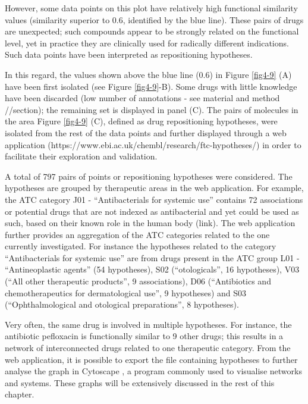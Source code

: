 However, some data points on this plot have relatively high functional similarity values (similarity superior to 0.6, identified by the blue line). These pairs of drugs are unexpected; such compounds appear to be strongly related on the functional level, yet in practice they are clinically used for radically different indications. Such data points have been interpreted as repositioning hypotheses.

In this regard, the values shown above the blue line (0.6) in Figure \ref{fig4-9} (A) have been first isolated (see Figure \ref{fig4-9}-B). Some drugs with little knowledge have been discarded (low number of annotations - see material and method //section); the remaining set is displayed in panel (C). The pairs of molecules in the area Figure \ref{fig4-9} (C), defined as drug repositioning hypotheses, were isolated from the rest of the data points and further displayed through a web application (https://www.ebi.ac.uk/chembl/research/ftc-hypotheses/) in order to facilitate their exploration and validation.

A total of 797 pairs of points or repositioning hypotheses were considered. The hypotheses are grouped by therapeutic areas in the web application. For example, the ATC category J01 - “Antibacterials for systemic use” contains 72 associations or potential drugs that are not indexed as antibacterial and yet could be used as such, based on their known role in the human body (link). The web application further provides an aggregation of the ATC categories related to the one currently investigated. For instance the hypotheses related to the category “Antibacterials for systemic use” are from drugs present in the ATC group L01 - “Antineoplastic agents” (54 hypotheses), S02 (“otologicals”, 16 hypotheses), V03 (“All other therapeutic products”, 9 associations), D06 (“Antibiotics and chemotherapeutics for dermatological use”, 9 hypotheses) and S03 (“Ophthalmological and otological preparations”, 8 hypotheses).

Very often, the same drug is involved in multiple hypotheses. For instance, the antibiotic pefloxacin is functionally similar to 9 other drugs; this results in a network of interconnected drugs related to one therapeutic category. From the web application, it is possible to export the file containing hypotheses to further analyse the graph in Cytoscape \citep{shannon2003cytoscape}, a program commonly used to visualise networks and systems. These graphs will be extensively discussed in the rest of this chapter.

